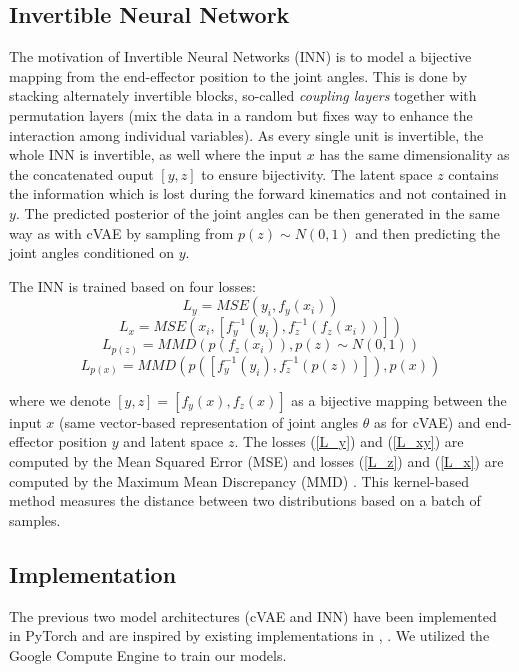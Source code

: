 \documentclass[conference]{IEEEtran}
\begin{document}
\subsection*{Invertible Neural Network}
The motivation of Invertible Neural Networks (INN) \cite{Ardizzone2018} is to model a bijective mapping from the end-effector position to the joint angles. This is done by stacking alternately invertible blocks, so-called \textit{coupling layers} \cite{Dinh2016} together with permutation layers (mix the data in a random but fixes way to enhance the interaction among individual variables). As every single unit is invertible, the whole INN is invertible, as well where the input $x$ has the same dimensionality as the concatenated ouput $[y, z]$ to ensure bijectivity. The latent space $z$ contains the information which is lost during the forward kinematics and not contained in $y$. The predicted posterior of the joint angles can be then generated in the same way as with cVAE by sampling from $p(z) \sim N(0, 1)$ and then predicting the joint angles conditioned on $y$.

The INN is trained based on four losses:
\begin{equation}
    L_y = MSE(y_i, f_y(x_i))
    \label{L_y}
\end{equation}
\begin{equation}
    L_x = MSE(x_i, [f_y^{-1}(y_i),f_z^{-1}(f_z(x_i))])
    \label{L_xy}
\end{equation}
\begin{equation}
    L_{p(z)} = MMD(p(f_z(x_i)), p(z)\sim N(0, 1))
    \label{L_z}
\end{equation}
\begin{equation}
    L_{p(x)} = MMD(p([f_y^{-1}(y_i), f_z^{-1}(p(z))]), p(x))
    \label{L_x}
\end{equation}

where we denote $[y, z] = [f_y(x), f_z(x)]$ as a bijective mapping between the input $x$ (same vector-based representation of joint angles $\theta$ as for cVAE) and end-effector position $y$ and latent space $z$. The losses (\ref{L_y}) and (\ref{L_xy}) are computed by the Mean Squared Error (MSE) and losses (\ref{L_z}) and (\ref{L_x}) are computed by the Maximum Mean Discrepancy (MMD) \cite{Gretton2008}. This kernel-based method measures the distance between two distributions based on a batch of samples.

\subsection*{Implementation}
The previous two model architectures (cVAE and INN) have been implemented in PyTorch and are inspired by existing implementations in  \cite{graviraja2019}, \cite{freia2020}. We utilized the Google Compute Engine to train our models.
\end{document}
